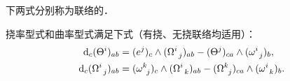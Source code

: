 下两式分别称为联络的．
\begin{theorem}
    挠率型式和曲率型式满足下式（有挠、无挠联络均适用）：
    \begin{subequations}\label{chccr:eqn_Bianchi-C}
    \begin{align}
        {\rm d}_c (\Theta ^{i})_{ab}   &=(e^j)_c \wedge (\Omega_{\hphantom{a} j} ^{i})_{ab}
        -(\Theta ^{j})_{ca} \wedge ( \omega _{\hphantom{a} j}^i )_b , \label{chccr:eqn_Bianchi-CI} \\
        {\rm d}_c (\Omega_{\hphantom{a} j} ^{i})_{ab}  &=  ( \omega _{\hphantom{a} j}^k )_c
        \wedge (\Omega_{\hphantom{a} k} ^{i})_{ab} - (\Omega_{\hphantom{a} j} ^{k})_{ca}\wedge
        ( \omega _{\hphantom{a} k}^i )_b .  \label{chccr:eqn_Bianchi-CII}
    \end{align}
    \end{subequations}
\end{theorem}
